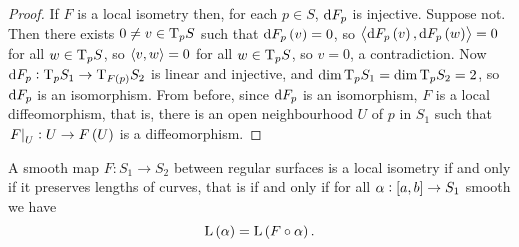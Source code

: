 \begin{proof}
If $ F $ is a local isometry then, for each $ p \in S $, $ \mathrm{d} F_p $ is injective. Suppose not. Then there exists $ 0 \ne v \in \mathrm{T}_p S $ such that $ \d F_p\br{v} = 0 $, so $ \abr{\d F_p\br{v}, \d F_p\br{w}} = 0 $ for all $ w \in \mathrm{T}_p S $, so $ \left\langle v, w \right\rangle = 0 $ for all $ w \in \mathrm{T}_p S $, so $ v = 0 $, a contradiction. Now $ \d F_p : \T_p S_1 \to \T_{F\br{p}} S_2 $ is linear and injective, and $ \dim \mathrm{T}_p S_1 = \dim \mathrm{T}_p S_2 = 2 $, so $ \mathrm{d} F_p $ is an isomorphism. From before, since $ \mathrm{d} F_p $ is an isomorphism, $ F $ is a local diffeomorphism, that is, there is an open neighbourhood $ U $ of $ p $ in $ S_1 $ such that $ \eval{F}_U : U \to F\br{U} $ is a diffeomorphism.
\end{proof}

\begin{proposition}
A smooth map $ F : S_1 \to S_2 $ between regular surfaces is a local isometry if and only if it preserves lengths of curves, that is if and only if for all $ \alpha : \sbr{a, b} \to S_1 $ smooth we have
$$ \L\br{\alpha} = \L\br{F \circ \alpha}. $$
\end{proposition}

